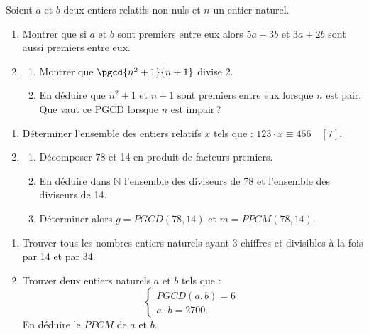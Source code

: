 \begin{exo}\label{exo:arith-19}
      Soient $a$ et $b$ deux entiers relatifs non nuls et $n$ un entier naturel.
      \begin{enumerate}
            \item Montrer que si $a$ et $b$ sont premiers entre eux alors $5a + 3b$ et $3a + 2b$ sont aussi premiers entre eux.
            \item \begin{enumerate}
                  \item Montrer que $\pgcd{n^2 + 1}{n+1}$ divise $2$.
                  \item En d\'eduire que $n^2 + 1$ et $n+1$ sont premiers entre eux lorsque $n$ est pair.
                        Que vaut ce PGCD lorsque $n$ est impair\,?
                  \end{enumerate}
      \end{enumerate}
\end{exo}
\begin{exo}\label{exo:arith-20}%
\begin{enumerate}
\item D\'eterminer l'ensemble des entiers relatifs $x$ tels que : $123 \cdot x \equiv 456 \quad [7]$.
\item \begin{enumerate}
      \item D\'ecomposer 78 et 14 en produit de facteurs premiers.
      \item En d\'eduire dans $\mathbb{N}$ l'ensemble des diviseurs de 78 et l'ensemble des diviseurs de 14.
      \item D\'eterminer alors $g = PGCD (78 , 14)$ et $m = PPCM (78 , 14)$.
      \end{enumerate}
\end{enumerate}
\end{exo}
\begin{exo}\label{exo:arith-21}%
\begin{enumerate}
\item Trouver tous les nombres entiers naturels ayant 3 chiffres et divisibles \`a la fois par 14 et par 34.
\item Trouver deux entiers naturels $a$ et $b$ tels que : 
      $$
      \left\lbrace
      \begin{array}{l}
      PGCD (a,b) = 6 \\
      a \cdot b = 2700      .
      \end{array}
      \right.
      \;
      $$
      En d\'eduire le $PPCM$ de $a$ et $b$.
\end{enumerate}
\end{exo}

